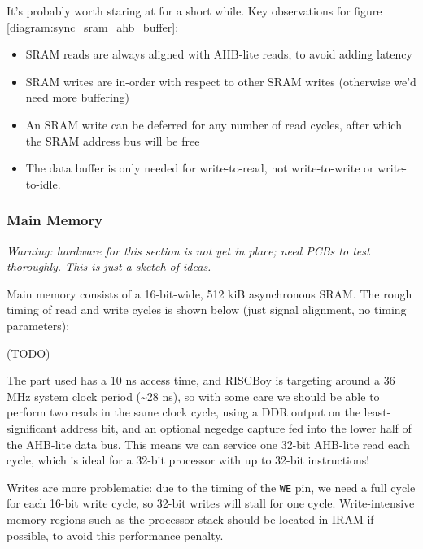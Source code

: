 It's probably worth staring at for a short while. Key observations for figure \ref{diagram:sync_sram_ahb_buffer}:

\begin{itemize}
	\item SRAM reads are always aligned with AHB-lite reads, to avoid adding latency
	\item SRAM writes are in-order with respect to other SRAM writes (otherwise we'd need more buffering)
	\item An SRAM write can be deferred for any number of read cycles, after which the SRAM address bus will be free
	\item The data buffer is only needed for write-to-read, not write-to-write or write-to-idle.
\end{itemize}


\subsubsection{Main Memory}

{\it Warning: hardware for this section is not yet in place; need PCBs to test thoroughly. This is just a sketch of ideas.}

Main memory consists of a 16-bit-wide, 512 kiB asynchronous SRAM. The rough timing of read and write cycles is shown below (just signal alignment, no timing parameters):

(TODO)

The part used has a 10 ns access time, and RISCBoy is targeting around a 36 MHz system clock period (\textasciitilde 28 ns), so with some care we should be able to perform two reads in the same clock cycle, using a DDR output on the least-significant address bit, and an optional negedge capture fed into the lower half of the AHB-lite data bus. This means we can service one 32-bit AHB-lite read each cycle, which is ideal for a 32-bit processor with up to 32-bit instructions!

Writes are more problematic: due to the timing of the {\tt WE} pin, we need a full cycle for each 16-bit write cycle, so 32-bit writes will stall for one cycle. Write-intensive memory regions such as the processor stack should be located in IRAM if possible, to avoid this performance penalty.

